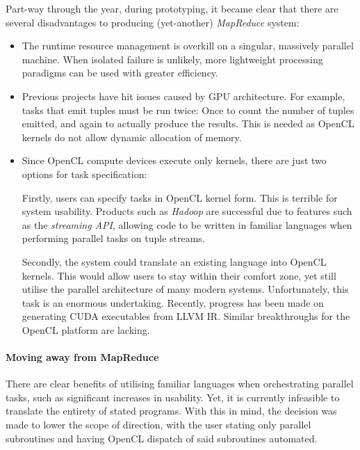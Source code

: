 Part-way through the year, during prototyping, it became clear that there are several disadvantages to producing (yet-another) \emph{MapReduce} system:
\begin{itemize}
\item The runtime resource management is overkill on a singular, massively parallel machine. When isolated failure is unlikely, more lightweight processing paradigms can be used with greater efficiency.

\item Previous projects have hit issues caused by \ac{GPU} architecture. For example, tasks that emit tuples must be run twice: Once to count the number of tuples emitted, and again to actually produce the results. This is needed as \ac{OpenCL} kernels do not allow dynamic allocation of memory.

\item Since \ac{OpenCL} compute devices execute only kernels, there are just two options for task specification:

Firstly, users can specify tasks in \ac{OpenCL} kernel form. This is terrible for system usability. Products such as \emph{Hadoop} are successful due to features such as the \emph{streaming \ac{API}}, allowing code to be written in familiar languages when performing parallel tasks on tuple streams.

Secondly, the system could translate an existing language into \ac{OpenCL} kernels. This would allow users to stay within their comfort zone, yet still utilise the parallel architecture of many modern systems. Unfortunately, this task is an enormous undertaking. Recently, progress has been made on generating \ac{CUDA} executables from LLVM \ac{IR}. Similar breakthroughs for the \ac{OpenCL} platform are lacking.
\end{itemize}

\paragraph*{Moving away from MapReduce}
There are clear benefits of utilising familiar languages when orchestrating parallel tasks, such as significant increases in usability.
Yet, it is currently infeasible to translate the entirety of stated programs.
With this in mind, the decision was made to lower the scope of direction, with the user stating only parallel subroutines and having \ac{OpenCL} dispatch of said subroutines automated.

